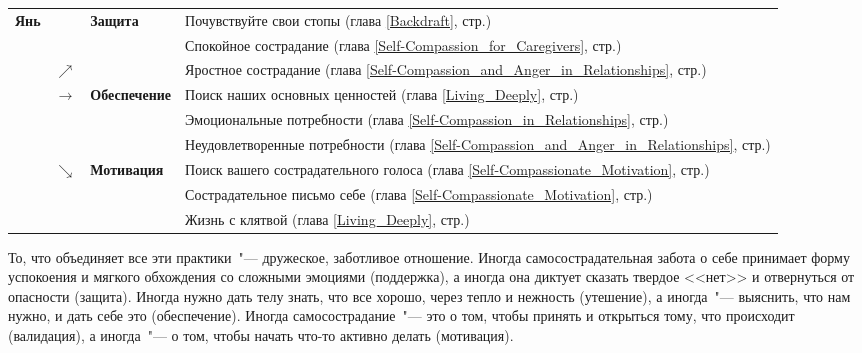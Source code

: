 \begin{table}[!h]
	\begin{center}
		\setlength{\extrarowheight}{1mm}
		\begin{tabular}{p{1.2cm}p{3mm}p{2.6cm}||p{9.9cm}}
			\cline{3-4}
			\multirow{9}{*}{{\LARGE\textbf{Янь}}} &  & \multirow{3}{*}{\textbf{Защита}} & {\small Почувствуйте свои стопы (глава \ref{Backdraft}, стр.\:\pageref{IP:Feeling_the_Soles_of_Your_Feet})} \\ 
			&  &  & {\small Спокойное сострадание (глава \ref{Self-Compassion_for_Caregivers}, стр.\:\pageref{IP:Compassion_with_Equanimity})}\\ 
			& $\nearrow$ &  & {\small Яростное сострадание (глава \ref{Self-Compassion_and_Anger_in_Relationships}, стр.\:\pageref{Ex:Fierce_Compassion})}\\ \cline{3-4}
			& \multirow{3}{*}{\textbf{$\rightarrow$}} & \multirow{3}{*}{\textbf{Обеспечение}} & {\small Поиск наших основных ценностей (глава \ref{Living_Deeply}, стр.\:\pageref{Ex:Discovering_Our_Core_Values})}\\
			&   &   & {\small Эмоциональные потребности} (глава \ref{Self-Compassion_in_Relationships}, стр.\:\pageref{Ex:Fulfilling_Our_Emotional_Needs})\\
			&   &   & {\small Неудовлетворенные потребности (глава \ref{Self-Compassion_and_Anger_in_Relationships}, стр.\:\pageref{Ex:Meeting_Unmet_Needs})}\\ \cline{3-4}
			& $\searrow$ & \multirow{3}{*}{\textbf{Мотивация}} & {\small Поиск вашего сострадательного голоса (глава \ref{Self-Compassionate_Motivation}, стр.\:\pageref{EX:Finding_Your_Compassionate_Voice})}\\
			&   &   & {\small Сострадательное письмо себе (глава \ref{Self-Compassionate_Motivation}, стр.\:\pageref{IP:Compassionate_Letter_to_Myself})}\\
			&   &   & {\small Жизнь с клятвой (глава \ref{Living_Deeply}, стр.\:\pageref{IP:Living_with_a_Vow})}\\ \cline{3-4}
		\end{tabular}
		\setlength{\extrarowheight}{0mm}
	\end{center}
\end{table} 

То, что объединяет все эти практики~"--- дружеское, заботливое отношение. Иногда самосострадательная забота о себе принимает форму успокоения и мягкого обхождения со сложными эмоциями (поддержка), а иногда она диктует сказать твердое <<нет>> и отвернуться от опасности (защита). Иногда нужно дать телу знать, что все хорошо, через тепло и нежность (утешение), а иногда~"--- выяснить, что нам нужно, и дать себе это (обеспечение). Иногда самосострадание~"--- это о том, чтобы принять и открыться тому, что происходит (валидация), а иногда~"--- о том, чтобы начать что-то активно делать (мотивация). 

